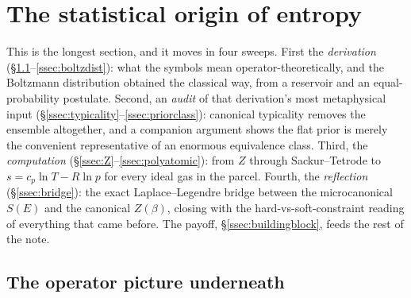 \documentclass[11pt,a4paper]{article}
\theoremstyle{definition}
\begin{document}
\section{The statistical origin of entropy}\label{sec:statmech}

This is the longest section, and it moves in four sweeps. First the
\emph{derivation} (\S\ref{ssec:operator}--\ref{ssec:boltzdist}): what the
symbols mean operator-theoretically, and the Boltzmann distribution obtained
the classical way, from a reservoir and an equal-probability postulate. Second,
an \emph{audit} of that derivation's most metaphysical input
(\S\ref{ssec:typicality}--\ref{ssec:priorclass}): canonical typicality removes
the ensemble altogether, and a companion argument shows the flat prior is
merely the convenient representative of an enormous equivalence class. Third,
the \emph{computation} (\S\ref{ssec:Z}--\ref{ssec:polyatomic}): from $Z$
through Sackur--Tetrode to $s=c_p\ln T-R\ln p$ for every ideal gas in the
parcel. Fourth, the \emph{reflection} (\S\ref{ssec:bridge}): the exact
Laplace--Legendre bridge between the microcanonical $S(E)$ and the canonical
$Z(\beta)$, closing with the hard-vs-soft-constraint reading of everything that
came before. The payoff, \S\ref{ssec:buildingblock}, feeds the rest of the
note.

\subsection{The operator picture underneath}\label{ssec:operator}
\end{document}
